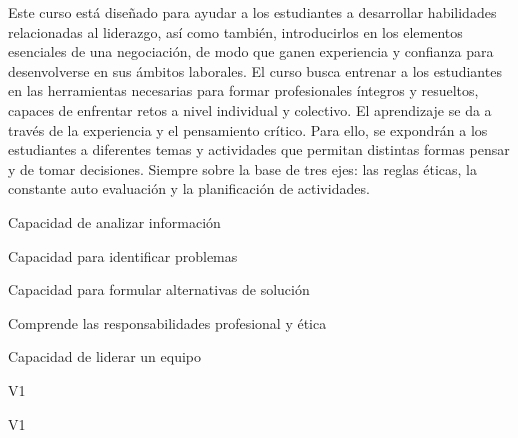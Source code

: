 \begin{syllabus}


\begin{justification}
Este curso está diseñado para ayudar a los estudiantes a desarrollar habilidades relacionadas al liderazgo, así como también, introducirlos en los elementos esenciales de una negociación, de modo que ganen experiencia y confianza para desenvolverse en sus ámbitos laborales.
El curso busca entrenar a los estudiantes en las herramientas necesarias para formar profesionales íntegros y resueltos, capaces de enfrentar retos a nivel individual y colectivo. El aprendizaje se da a través de la experiencia y el pensamiento crítico. Para ello, se expondrán a los estudiantes a diferentes temas y actividades que permitan distintas formas pensar y de tomar decisiones. Siempre sobre la base de tres ejes: las reglas éticas, la
constante auto evaluación y la planificación de actividades.
\end{justification}

\begin{goals}
\item Capacidad de analizar información
\item Capacidad para identificar problemas
\item Capacidad para formular alternativas de solución
\item Comprende las responsabilidades profesional y ética
\item Capacidad de liderar un equipo
\end{goals}

\begin{outcomes}{V1}
    \item {} %
    \item {} %
    \item {} %
    \item {} %
    \item {} %
\end{outcomes}

\begin{competences}{V1}
    \item {}
    \item {}
    \item {}
    \item {}
\end{competences}


\end{syllabus}
